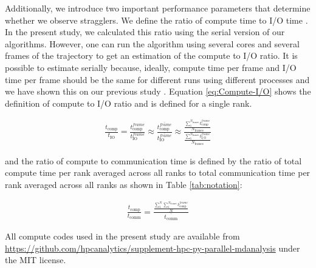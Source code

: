 Additionally, we introduce two important performance parameters that determine whether we observe stragglers.
We define the ratio of compute time to I/O time . 
In the present study, we calculated this ratio using the serial version of our algorithms.
However, one can run the algorithm using several cores and several frames of the trajectory to get an estimation of the compute to I/O ratio. 
It is possible to estimate  serially because, ideally, compute time per frame and I/O time per frame should be the same for different runs using different processes and we have shown this on our previous study \cite{Khoshlessan:2017ab}. Equation \ref{eq:Compute-I/O} shows the definition of compute to I/O ratio and is defined for a single rank.
 

\begin{gather}
  \label{eq:Compute-I/O}
    \frac{t_{\text{comp}}}{t_{\text{IO}}}=\frac{t_{\text{comp}}^{frame}}{t_{\text{IO}}^{frame}} \approx \frac{\overline{t_{\text{comp}}^{frame}}}{\overline{t_{\text{IO}}^{frame}}} \approx \frac{\frac{\sum_{1}^{N_{\text{frames}}}t_{\text{comp}}^{frame}}{N_{\text{frames}}}}{\frac{\sum_{1}^{N_{\text{frames}}}t_{\text{I/O}}^{frame}}{N_{\text{frames}}}} 
 \end{gather}

and the ratio of compute to communication time is defined by the ratio of total compute time per rank averaged across all ranks to total communication time per rank averaged across all ranks as shown in Table \ref{tab:notation}:

\begin{gather}
  \label{eq:Compute-comm}
       \frac{t_{\text{comp}}}{t_{\text{comm}}}= \frac{\frac{\sum_{1}^{N}\sum_{1}^{N_{\text{frames}}}t_{\text{comp}}^{frame}}{N}}{\overline{t_{\text{comm}}}}  
 \end{gather}
 
All compute codes used in the present study are available from \url{https://github.com/hpcanalytics/supplement-hpc-py-parallel-mdanalysis} under the MIT license. 
 
